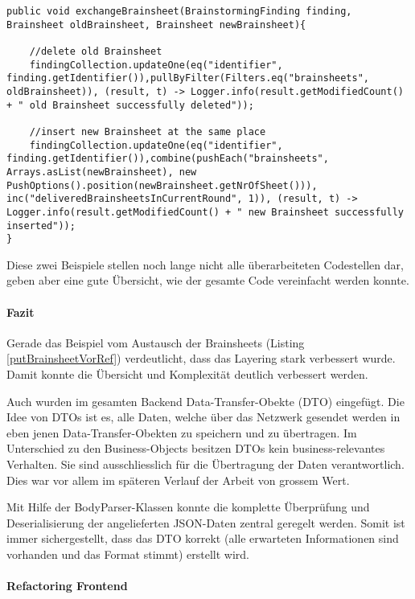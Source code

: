 \begin{lstlisting}[caption={Exchange Brainsheet im Data Access Layer}, label=exchangeBrainsheetDAL]
public void exchangeBrainsheet(BrainstormingFinding finding, Brainsheet oldBrainsheet, Brainsheet newBrainsheet){
    
    //delete old Brainsheet
    findingCollection.updateOne(eq("identifier", finding.getIdentifier()),pullByFilter(Filters.eq("brainsheets", oldBrainsheet)), (result, t) -> Logger.info(result.getModifiedCount() + " old Brainsheet successfully deleted"));
    
    //insert new Brainsheet at the same place
    findingCollection.updateOne(eq("identifier", finding.getIdentifier()),combine(pushEach("brainsheets", Arrays.asList(newBrainsheet), new PushOptions().position(newBrainsheet.getNrOfSheet())), inc("deliveredBrainsheetsInCurrentRound", 1)), (result, t) -> Logger.info(result.getModifiedCount() + " new Brainsheet successfully inserted"));
}
\end{lstlisting}
Diese zwei Beispiele stellen noch lange nicht alle überarbeiteten Codestellen dar, geben aber eine gute Übersicht, wie der gesamte Code vereinfacht werden konnte.

\paragraph*{Fazit}
Gerade das Beispiel vom Austausch der Brainsheets (Listing \ref{putBrainsheetVorRef}) verdeutlicht, dass das Layering stark verbessert wurde. Damit konnte die Übersicht und Komplexität deutlich verbessert werden.

Auch wurden im gesamten Backend Data-Transfer-Obekte (DTO) \cite{DTO} eingefügt. Die Idee von DTOs ist es, alle Daten, welche über das Netzwerk gesendet werden in eben jenen Data-Transfer-Obekten zu speichern und zu übertragen. Im Unterschied zu den Business-Objects besitzen DTOs kein business-relevantes Verhalten. Sie sind ausschliesslich für die Übertragung der Daten verantwortlich. Dies war vor allem im späteren Verlauf der Arbeit von grossem Wert.

Mit Hilfe der BodyParser-Klassen konnte die komplette Überprüfung und Deserialisierung der angelieferten JSON-Daten zentral geregelt werden. Somit ist immer sichergestellt, dass das DTO korrekt (alle erwarteten Informationen sind vorhanden und das Format stimmt) erstellt wird. 

\paragraph*{Refactoring Frontend}~\\

